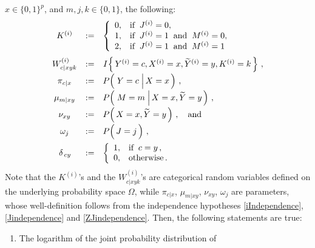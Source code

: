 \begin{theorem}
\;$x \in \{0,1\}^{p}$,
\;and
\;$m,j,k \in \{0,1\}$,
\;the following:
\begin{equation*}
\begin{array}{ccll}
	K^{(i)}
		&:=&
		\left\{\begin{array}{cl}
		0, & \textnormal{if}\;\; J^{(i)} = 0,
		\\
		1, & \textnormal{if}\;\; J^{(i)} = 1 \;\;\textnormal{and}\;\; M^{(i)} = 0,
		\\
		2, & \textnormal{if}\;\; J^{(i)} = 1 \;\;\textnormal{and}\;\; M^{(i)} = 1
		\end{array}\right.
	\\
	W^{(i)}_{c \vert xyk}
		&:=&
		\overset{\textnormal{\large\color{white}1}}{I}\!\left\{\,Y^{(i)}=c,X^{(i)}=x,\widetilde{Y}^{(i)}=y,K^{(i)}=k\,\right\}\,,
	\\
	\pi_{c \vert x}
		&\overset{{\color{white}\vert}}{:=}&
		P\!\left(\,\left.\overset{{\color{white}.}}{Y}=c\;\right\vert X=x\,\right)\,,
	\\
	\mu_{m \vert xy}
		&\overset{{\color{white}\vert}}{:=}&
		P\!\left(\,\left.\overset{{\color{white}.}}{M}=m\;\right\vert X=x, \widetilde{Y}=y\,\right)\,,
	\\
	\nu_{xy}
		&\overset{{\color{white}\vert}}{:=}&
		P\!\left(\,\overset{{\color{white}.}}{X}=x, \widetilde{Y}=y\,\right)\,,
		\quad\textnormal{and}
	\\
	\omega_{j}
		&\overset{{\color{white}\vert}}{:=}&
		P\!\left(\,\overset{{\color{white}.}}{J}=j\,\right)\,,
	\\
	\overset{\textnormal{\Large\color{white}1}}{\delta}_{cy}
		&\overset{{\color{white}\vert}}{:=}&
		\left\{\begin{array}{cl}
			1, & \textnormal{if}\;\; c = y\,,
			\\
			0, & \textnormal{otherwise}\,.
		\end{array}\right.
\end{array}
\end{equation*}
Note that the $K^{(i)}$'s and the $W^{(i)}_{c \vert xyk}$'s
are categorical random variables defined on the underlying probability space $\Omega$,
while $\pi_{c \vert x}$, $\mu_{m \vert xy}$, $\nu_{xy}$, $\omega_{j}$ are parameters,
whose well-definition follows from the independence hypotheses
\eqref{iIndependence}, \eqref{Jindependence} and \eqref{ZJindependence}.
\vskip 0.3cm
\noindent
Then, the following statements are true:
\begin{enumerate}
\item
	The logarithm of the joint probability distribution of

\end{enumerate}
\end{theorem}

